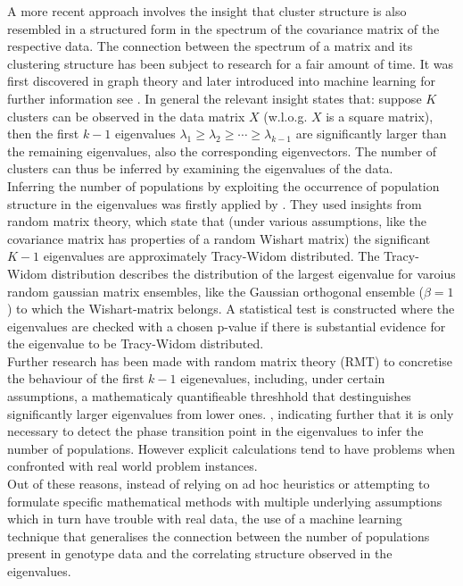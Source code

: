 \documentclass[a4paper, 11pt]{article}
\begin{document}
A more recent approach involves the insight that cluster structure is also resembled in a structured form in the spectrum of the covariance matrix of the respective data. The connection between the spectrum of a matrix and its clustering structure has been subject to research for a fair amount of time. It was first discovered in graph theory \cite{donath1973lower} \cite{fiedler1973algebraic} and later introduced into machine learning \parencite{shi2000normalized, meila2001random, ng2002spectral} for further information see \cite{von2007tutorial}. In general the relevant insight states that: suppose $K$ clusters can be observed in the data matrix $X$ (w.l.o.g. $X$ is a square matrix), then the first $k-1$ eigenvalues $\lambda_1 \geq \lambda_2 \geq \cdots \geq \lambda_{k-1}$ are significantly larger than the remaining eigenvalues, also the corresponding eigenvectors. The number of clusters can thus be inferred by examining the eigenvalues of the data.\\
Inferring the number of populations by exploiting the occurrence of population structure in the eigenvalues was firstly applied by \cite{patterson2006population}. They used insights from random matrix theory, which state that (under various assumptions, like the covariance matrix has properties of a random Wishart matrix) the significant $K-1$ eigenvalues are approximately Tracy-Widom distributed. The Tracy-Widom distribution describes the distribution of the largest eigenvalue for varoius random gaussian matrix ensembles, like the Gaussian orthogonal ensemble ($\beta = 1$) to which the Wishart-matrix belongs. A statistical test is constructed where the eigenvalues are checked with a chosen p-value if there is substantial evidence for the eigenvalue to be Tracy-Widom distributed.\\

Further research has been made with random matrix theory (RMT) to concretise the behaviour of the first $k-1$ eigenevalues, including, under certain assumptions, a mathematicaly quantifieable threshhold that destinguishes significantly larger eigenvalues from lower ones. \cite{bryc2013separation}, indicating further that it is only necessary to detect the phase transition point in the eigenvalues to infer the number of populations. However explicit calculations tend to have problems when confronted with real world problem instances.\\
Out of these reasons, instead of relying on ad hoc heuristics or attempting to formulate specific mathematical methods with multiple underlying assumptions which in turn have trouble with real data, the use of a machine learning technique that generalises the connection between the number of populations present in genotype data and the correlating structure observed in the eigenvalues.\\
\end{document}
